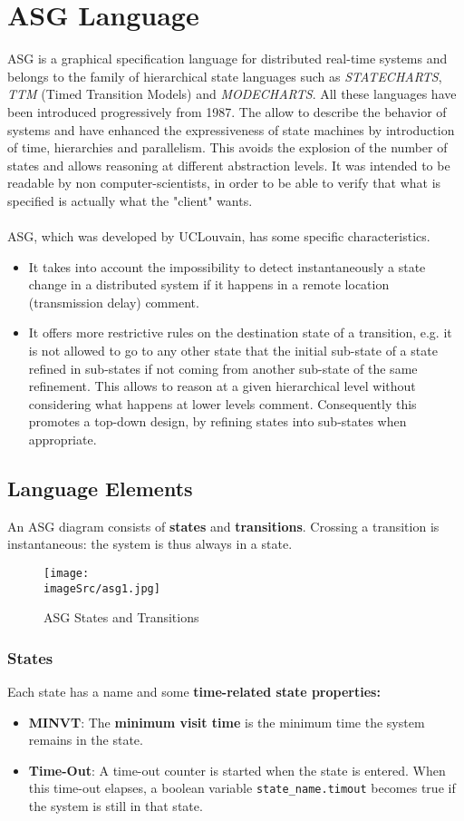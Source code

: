 \documentclass[../main.tex]{subfiles}
\renewcommand{\imageSrc}{../images/}
\begin{document}
\chapter{ASG Language}
ASG is a graphical specification language for distributed real-time systems and belongs to the family of hierarchical state languages such as \textit{STATECHARTS}, \textit{TTM} (Timed Transition Models) and \textit{MODECHARTS}. All these languages have been introduced progressively from 1987. The allow to describe the behavior of systems and have enhanced the expressiveness of state machines by introduction of time, hierarchies and parallelism. This avoids the explosion of the number of states and allows reasoning at different abstraction levels. It was intended to be readable by non computer-scientists, in order to be able to verify that what is specified is actually what the "client" wants.
\\\\
ASG, which was developed by UCLouvain, has some specific characteristics. 
\begin{itemize}
	\item It takes into account the impossibility to detect instantaneously a state change in a distributed system if it happens in a remote location (transmission delay) comment.
	\item It offers more restrictive rules on the destination state of a transition, e.g. it is not allowed to go to any other state that the initial sub-state of a state refined in sub-states if not coming from another sub-state of the same refinement. This allows to reason at a given hierarchical level without considering what happens at lower levels  comment. Consequently this promotes a top-down design, by refining states into sub-states when appropriate.
\end{itemize}

\section{Language Elements}
An ASG diagram consists of \textbf{states} and \textbf{transitions}. Crossing a transition is instantaneous: the system is thus always in a state.
\begin{figure}[H]
    \centering
    \texttt{[image: \\imageSrc/asg1.jpg]}
    \caption{ASG States and Transitions}
    \label{asg1}
\end{figure}

\subsection{States}
Each state has a name and some \textbf{time-related state properties:}
\begin{itemize}
	\item \textbf{MINVT}: The \textbf{minimum visit time} is the minimum time the system remains in the state.
	\item \textbf{Time-Out}: A time-out counter is started when the state is entered. When this time-out elapses, a boolean variable \texttt{state\_name.timout} becomes true if the system is still in that state. 
\end{itemize}
\end{document}
